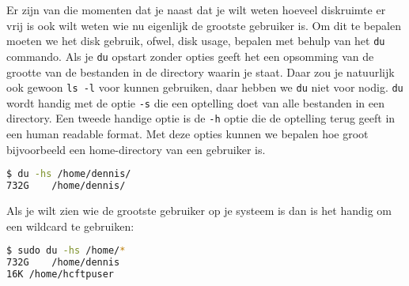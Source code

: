 Er zijn van die momenten dat je naast dat je wilt weten hoeveel diskruimte er vrij is ook wilt weten wie nu eigenlijk de grootste gebruiker is. Om dit te bepalen moeten we het disk gebruik, ofwel, disk usage, bepalen met behulp van het \texttt{du} commando. Als je \texttt{du} opstart zonder opties geeft het een opsomming van de grootte van de bestanden in de directory waarin je staat. Daar zou je natuurlijk ook gewoon \texttt{ls -l} voor kunnen gebruiken, daar hebben we \texttt{du} niet voor nodig. \texttt{du} wordt handig met de optie \texttt{-s} die een optelling doet van alle bestanden in een directory. Een tweede handige optie is de \texttt{-h} optie die de optelling terug geeft in een human readable format. Met deze opties kunnen we bepalen hoe groot bijvoorbeeld een home-directory van een gebruiker is.

\begin{lstlisting}[language=bash]
$ du -hs /home/dennis/
732G	/home/dennis/
\end{lstlisting}

Als je wilt zien wie de grootste gebruiker op je systeem is dan is het handig om een wildcard te gebruiken:
\begin{lstlisting}[language=bash]
$ sudo du -hs /home/*
732G	/home/dennis
16K	/home/hcftpuser
\end{lstlisting}
